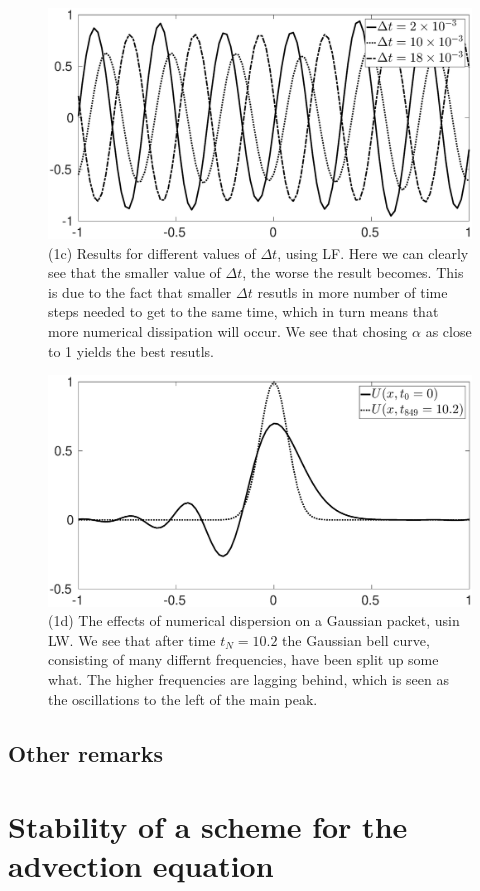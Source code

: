 \documentclass[11pt,letter, swedish, english
]{article}
\newcommand{\Dt}{\ensuremath{\Delta{t}}}
\begin{document}
\begin{figure}
\centering
\includegraphics[width=1\textwidth]{1c.eps}
\caption{(1c) Results for different values of $\Dt$, using LF. Here we
can clearly see that the smaller value of $\Dt$, the worse the result
becomes. This is due to the fact that smaller $\Dt$ resutls in more
number of time steps needed to get to the same time, which in turn
means that more numerical dissipation will occur. We see that chosing
$\alpha$ as close to 1 yields the best resutls. }
\label{fig:1c}
\end{figure}


\begin{figure}
\centering
\includegraphics[width=1\textwidth]{1d.eps}
\caption{(1d) The effects of numerical dispersion on a Gaussian
  packet, usin LW. We see that after time $t_N=10.2$ the Gaussian bell
  curve, consisting of many differnt frequencies, have been split up
  some what. The higher frequencies are lagging behind, which is seen
  as the oscillations to the left of the main peak. }
\label{fig:1d}
\end{figure}

\clearpage
\restoregeometry
\addtocounter{subsection}{4}
\subsection{Other remarks}



\section{Stability of a scheme for the advection equation}
\end{document}
